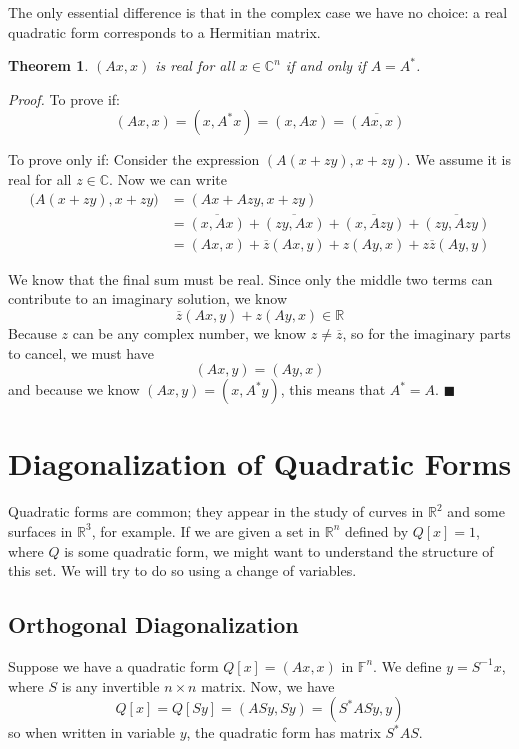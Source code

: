 \documentclass[a4paper,10pt]{book}
\newcommand{\R}{\mathbb{R}}
\newcommand{\C}{\mathbb{C}}
\newcommand{\F}{\mathbb{F}}
\theoremstyle{plain}
\newtheorem{theorem}{Theorem}[section]
\renewenvironment{proof}{\textsl{Proof.}}{\hfill$\blacksquare$}
\theoremstyle{plain}
\theoremstyle{definition}
\begin{document}
The only essential difference is that in the complex case we have no choice: a real quadratic form corresponds to a Hermitian matrix. 

\begin{theorem}
$(Ax, x)$ is real for all $x \in \C^{n}$ if and only if $A = A^{*}$.  
\end{theorem}

\begin{proof}
To prove if: 
$$(Ax, x) = (x, A^{*} x) = (x, Ax) = \overline{(Ax, x)}$$

To prove only if: Consider the expression $(A (x + zy), x + zy)$. We assume it is real for all $z \in \C$. Now we can write 
$$
\begin{aligned}
\Big( A (x + zy), x + zy \Big) &= ( Ax + Azy, x + zy) \\
&= \overline{(x, Ax)} + \overline{(zy, Ax)} + \overline{(x, Azy)} + \overline{(zy, Azy)} \\ 
&= (Ax, x) + \overline{z} (Ax, y) + z (Ay, x) + z \overline{z} (Ay, y)
\end{aligned}
$$

We know that the final sum must be real. Since only the middle two terms can contribute to an imaginary solution, we know 
$$\overline{z} (Ax, y) + z (Ay, x) \in \R$$
Because $z$ can be any complex number, we know $z \neq \overline{z}$, so for the imaginary parts to cancel, we must have
$$(Ax, y) = (Ay, x)$$
and because we know $(Ax, y) = (x, A^{*} y)$, this means that $A^{*} = A$. 
\end{proof}

\section{Diagonalization of Quadratic Forms}

Quadratic forms are common; they appear in the study of curves in $\R^{2}$ and some surfaces in $\R^{3}$, for example. If we are given a set in $\R^{n}$ defined by $Q[x] = 1$, where $Q$ is some quadratic form, we might want to understand the structure of this set. We will try to do so using a change of variables. 

\subsection{Orthogonal Diagonalization}

Suppose we have a quadratic form $Q[x] = (Ax, x)$ in $\F^{n}$. We define $y = S^{-1} x$, where $S$ is any invertible $n \times n$ matrix. Now, we have
$$Q[x] = Q[Sy] = (ASy, Sy) = (S^{*} AS y, y)$$
so when written in variable $y$, the quadratic form has matrix $S^{*}AS$. 
\end{document}
